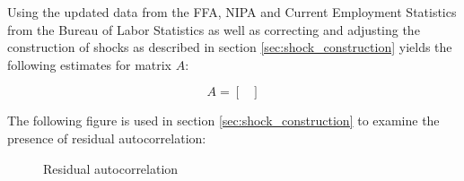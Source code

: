 Using the updated data from the FFA, NIPA and Current Employment Statistics from the Bureau of Labor Statistics as well as correcting and adjusting the construction of shocks as described in section \ref{sec:shock_construction} yields the following estimates for matrix $A$:
\begin{center}
\[
    A=
      \begin{bmatrix}
    	
      \end{bmatrix}
\]
\end{center}

The following figure is used in section \ref{sec:shock_construction} to examine the presence of residual autocorrelation:

\begin{figure}[ht]
	\caption{Residual autocorrelation}
	\label{fig:residual_autocorrelation}
\end{figure}